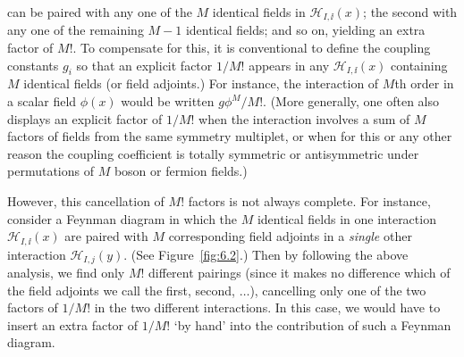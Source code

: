 \noindent can be paired with any one of the $M$ identical fields in
$\mathcal H_{I,\ii}(x)$; the second with any one of the remaining $M-1$
identical fields; and so on, yielding an extra factor of $M!$. To compensate
for this, it is conventional to define the coupling constants $g_i$ so that an
explicit factor $1/M!$ appears in any $\mathcal H_{I,\ii}(x)$ containing $M$
identical fields (or field adjoints.) For instance, the interaction of $M$th
order in a scalar field $\phi(x)$ would be written $g\phi^M/M!$. (More
generally, one often also displays an explicit factor of $1/M!$ when the
interaction involves a sum of $M$ factors of fields from the same symmetry
multiplet, or when for this or any other reason the coupling coefficient is
totally symmetric or antisymmetric under permutations of $M$ boson or fermion
fields.)

However, this cancellation of $M!$ factors is not always complete. For
instance, consider a Feynman diagram in which the $M$ identical fields in one
interaction $\mathcal H_{I,\ii}(x)$ are paired with $M$ corresponding field
adjoints in a \emph{single} other interaction $\mathcal H_{I,j}(y)$. (See
Figure~\ref{fig:6.2}.) Then by following the above analysis, we find only $M!$ different
pairings (since it makes no difference which of the field adjoints we call the
first, second, $\ldots$), cancelling only one of the two factors of $1/M!$ in
the two different interactions. In this case, we would have to insert an extra
factor of $1/M!$ `by hand' into the contribution of such a Feynman diagram.

